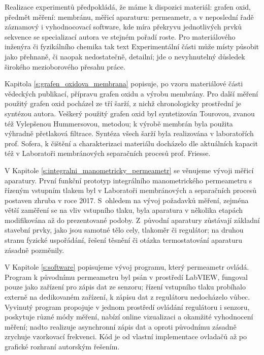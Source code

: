 Realizace experimentů předpokládá, že máme k dispozici materiál: grafen oxid, předmět měření: membránu, měřicí aparaturu: permeametr, a v neposlední řadě záznamový i vyhodnocovací software, kde míra překryvu jednotlivých prvků sekvence se specializací autora ve stejném pořadí roste. Pro materiálového inženýra či fyzikálního chemika tak text Experimentální části může místy působit jako přehnaně, či naopak nedostatečně, detailní; jde o nevyhnutelný důsledek širokého mezioborového přesahu práce.

Kapitola \ref{s:grafen_oxidova_membrana} popisuje, po vzoru materiálové části vědeckých publikací, přípravu grafen oxidu a výrobu membrány. Pro další měření použitý grafen oxid pocházel ze tří šarží, z nichž chronologicky prostřední je syntézou autora. Veškerý použitý grafen oxid byl syntetizován Tourovou, zvanou též Vylepšenou Hummersovou, metodou; k výrobě membrán byla použita výhradně přetlaková filtrace. Syntéza všech šarží byla realizována v laboratořích prof. Sofera, k čištění a charakterizaci materiálu docházelo dle aktuálních kapacit též v Laboratoři membránových separačních procesů prof. Friesse. 

V Kapitole \ref{s:integralni_manometricky_permeametr} se věnujeme vývoji měřicí aparatury. První funkční prototyp integrálního manometrického permeametru s řízeným vstupním tlakem byl v Laboratoři membránových a separačních procesů postaven zhruba v roce 2017. S~ohledem na vývoj požadavků měření, zejména větší zaměření se na vliv vstupního tlaku, byla aparatura v několika etapách modifikována až do prezentované podoby. Z~původní aparatury zůstávají základní stavební prvky, jako jsou samotné tělo cely, tlakoměr či regulátor; na druhou stranu fyzické uspořádání, řešení těsnění či otázka termostatování aparaturu zásadně pozměnily.

V Kapitole \ref{s:software} popisujeme vývoj programu, který permeametr ovládá. Program k původnímu permeametru byl psán v prostředí LabVIEW, fungoval pouze jako zařízení pro zápis dat ze senzoru; řízení vstupního tlaku probíhalo externě na dedikovaném zařízení, k zápisu dat z regulátoru nedocházelo vůbec. Vyvinutý program propojuje v jednom prostředí ovládání regulátoru i senzoru, poskytuje různé módy měření, nabízí online vizualizaci a okamžité vyhodnocení měření; nadto realizuje asynchronní zápis dat a oproti původnímu zásadně zrychuje vzorkovací frekvenci. Kód je od vlastní implementace ovladačů až po grafické rozhraní autorským řešením.

